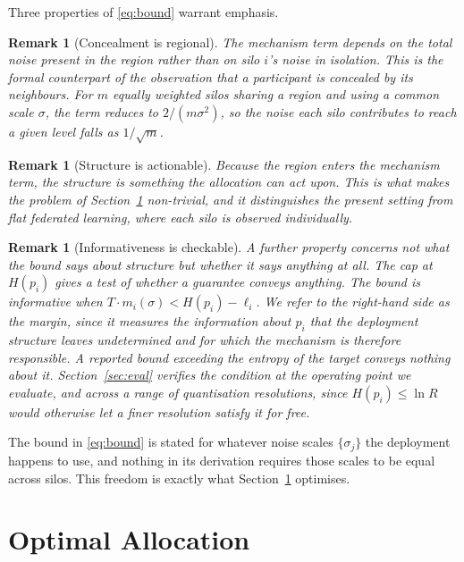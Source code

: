 \documentclass[acmsmall,screen,review,anonymous]{acmart}
\theoremstyle{acmdefinition}%
\newtheorem{remark}[theorem]{Remark}%
\begin{document}
Three properties of \eqref{eq:bound} warrant emphasis.

\begin{remark}[Concealment is regional]
\label{rem:regional}
The mechanism term depends on the total noise present in the region rather than on
silo $i$'s noise in isolation. This is the formal counterpart of the observation
that a participant is concealed by its neighbours. For $m$ equally weighted silos
sharing a region and using a common scale $\sigma$, the term reduces to $2/(m
\sigma^2)$, so the noise each silo contributes to reach a given level falls as
$1/\sqrt{m}$.
\end{remark}

\begin{remark}[Structure is actionable]
Because the region enters the mechanism term, the structure is something the
allocation can act upon. This is what makes the problem of
Section~\ref{sec:allocation} non-trivial, and it distinguishes the present setting
from flat federated learning, where each silo is observed individually.
\end{remark}

\begin{remark}[Informativeness is checkable]
\label{rem:informative}
A further property concerns not what the bound says about structure but whether it says anything at all. The cap at $H(p_i)$ gives a test of whether a guarantee conveys anything. The
bound is informative when $T \cdot m_i(\sigma) < H(p_i) - \ell_i$. We refer to the
right-hand side as the margin, since it measures the information about $p_i$ that
the deployment structure leaves undetermined and for which the mechanism is
therefore responsible. A reported bound exceeding the entropy of the target
conveys nothing about it. Section~\ref{sec:eval} verifies the condition at the
operating point we evaluate, and across a range of quantisation resolutions, since
$H(p_i) \le \ln R$ would otherwise let a finer resolution satisfy it for free.
\end{remark}

The bound in \eqref{eq:bound} is stated for whatever noise scales $\{\sigma_j\}$
the deployment happens to use, and nothing in its derivation requires those
scales to be equal across silos. This freedom is exactly what
Section~\ref{sec:allocation} optimises.

\section{Optimal Allocation}
\label{sec:allocation}
\end{document}
